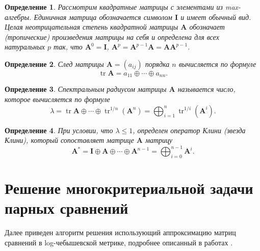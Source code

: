 \documentclass[specialist, substylefile = spbureport.rtx,
    subf,href,colorlinks=true, 12pt]{disser}
\newtheorem*{definition}{Определение}
\begin{document}
    \begin{definition}
        Рассмотрим квадратные матрицы с элементами из max-алгебры. Единичная матрица обозначается символом $\bm{I}$ и имеет обычный вид. Целая неотрицательная степень квадратной матрицы $\bm{A}$ обозначает (тропические) произведения матрицы на себя и определена для всех натуральных $p$ так, что $\bm{A}^{0}=\bm{I}$, $\bm{A}^{p}=\bm{A}^{p-1}\bm{A}=\bm{A}\bm{A}^{p-1}$.
    \end{definition}
        
    \begin{definition}
        След матрицы $\bm{A}=(a_{ij})$ порядка $n$ вычисляется по формуле 
        $$\mathop\mathrm{tr}\bm{A}=a_{11}\oplus\cdots\oplus a_{nn}.$$
    \end{definition}
        
    \begin{definition}
        Спектральным радиусом матрицы $\bm{A}$ называется число, которое вычисляется по формуле
        \begin{equation*}
        \lambda
        =
        \mathop\mathrm{tr}\bm{A}\oplus\cdots\oplus\mathop\mathrm{tr}\nolimits^{1/n}(\bm{A}^{n})
        =
        \bigoplus_{i=1}^{n}{\mathop\mathrm{tr}}^{1/i}(\bm{A}^{i}).
        \end{equation*}
    \end{definition}
        
    \begin{definition}
        При условии, что $\lambda\leq1$, определен оператор Клини (звезда Клини), который сопоставляет матрице $\bm{A}$ матрицу
        \begin{equation*}
        \bm{A}^{\ast}
        =
        \bm{I}\oplus\bm{A}\oplus\cdots\oplus\bm{A}^{n-1}
        =
        \bigoplus_{i=0}^{n-1}\bm{A}^{i}.
        \end{equation*}
    \end{definition}


    \chapter{Решение многокритериальной задачи парных сравнений}

    Далее приведен алгоритм решения использующий аппроксимацию матриц сравнений в log-чебышевской метрике, подробнее описанный в работах \cite{Krivulin2019Metody,Krivulin2019Tropical,Krivulin2022Using}. 
\end{document}
